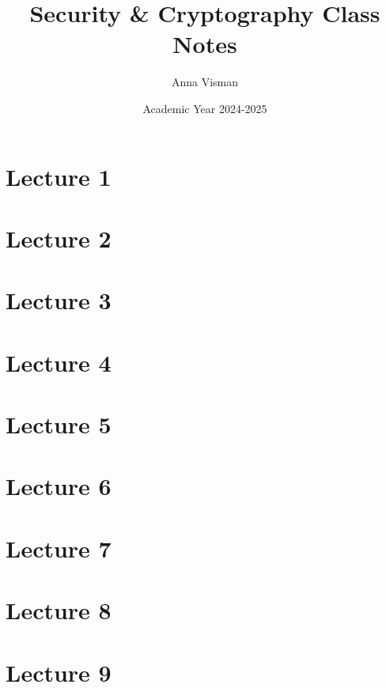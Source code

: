 \documentclass[10pt, oneside]{article}
\title{Security \& Cryptography Class Notes}
\author{Anna Visman}
\date{Academic Year 2024-2025}
\begin{document}
\maketitle
\tableofcontents

\vspace{.25in}

\newpage 
\section{Lecture 1}



\newpage

\section{Lecture 2}



\newpage

\section{Lecture 3}



\newpage

\section{Lecture 4}



\newpage

\section{Lecture 5}



\newpage

\section{Lecture 6}



\newpage

\section{Lecture 7}



\newpage

\section{Lecture 8}



\newpage 
\section{Lecture 9}



\newpage
\end{document}
